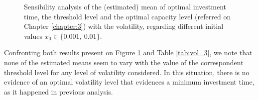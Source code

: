 \begin{figure}[!ht]
	\begin{subfigmatrix}{3}
	\end{subfigmatrix}
	\caption{Sensibility analysis of the (estimated) mean of optimal investment time, the threshold level and the optimal capacity level (referred on Chapter \ref{chapter:3}) with the volatility, regarding different initial values $x_0 \in \{0.001, \ 0.01\}$.}
	\label{fig:vol_3}
\end{figure}

Confronting both results present on Figure \ref{fig:vol_3} and Table \ref{tab:vol_3}, we note that none of the estimated means seem to vary with the value of the correspondent threshold level for any level of volatility considered. In this situation, there is no evidence of an optimal volatility level that evidences a minimum investment time, as it happened in previous analysis.


